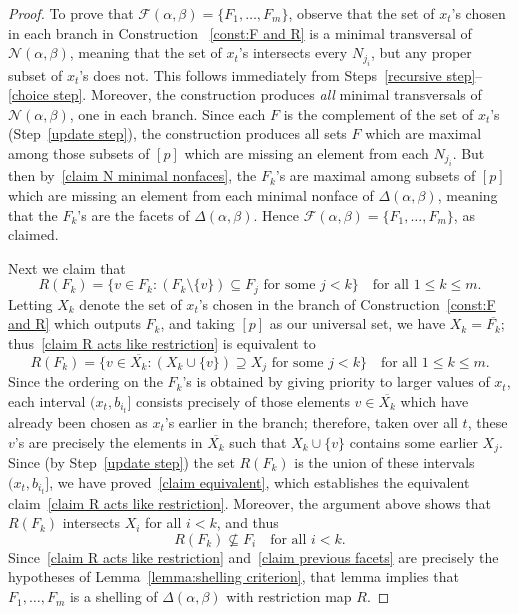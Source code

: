 \documentclass[noamsfonts,10pt]{amsart}
\newcommand{\NN}{\mathcal{N}}
\newcommand{\al}{\alpha}
\newcommand{\be}{\beta}
\newcommand{\F}{\mathcal{F}}
\newcommand{\1}{\mathbf{1}}
\theoremstyle{plain}
\theoremstyle{definition}
\numberwithin{equation}{section}
\begin{document}
\begin{proof}
    To prove that $\F(\al,\be) = \{F_1, \ldots, F_m\}$, observe that the set of $x_t$'s chosen in each branch in Construction ~\ref{const:F and R} is a minimal transversal of $\NN(\al,\be)$, meaning that the set of $x_t$'s intersects every $N_{j_i}$, but any proper subset of $x_t$'s does not.
    This follows immediately from Steps~\ref{recursive step}--\ref{choice step}.
    Moreover, the construction produces \emph{all} minimal transversals of $\NN(\al,\be)$, one in each branch.
    Since each $F$ is the complement of the set of $x_t$'s (Step~\ref{update step}), the construction produces all sets $F$ which are maximal among those subsets of $[p]$ which are missing an element from each $N_{j_i}$.
    But then by~\eqref{claim N minimal nonfaces}, the $F_k$'s are maximal among subsets of $[p]$ which are missing an element from each minimal nonface of $\Delta(\al,\be)$, meaning that the $F_k$'s are the facets of $\Delta(\al,\be)$.
    Hence $\F(\al,\be) = \{F_1, \ldots, F_m\}$, as claimed.

    Next we claim that 
    \begin{equation}
        \label{claim R acts like restriction}
        R(F_k) = \Big\{ v \in F_k : (F_k \setminus \{v\}) \subseteq F_j \text{ for some } j < k \Big\} \quad \text{for all $1 \leq k \leq m$}.
    \end{equation}
    Letting $X_k$ denote the set of $x_t$'s chosen in the branch of Construction~\ref{const:F and R} which outputs $F_k$, and taking $[p]$ as our universal set, we have $X_k = \overline{F_k}$;
    thus~\eqref{claim R acts like restriction} is equivalent to
    \begin{equation}
        \label{claim equivalent}
        R(F_k) = \Big\{ v \in \overline{X_k} : (X_k \cup \{v\} ) \supseteq X_j \text{ for some } j < k \Big\} \quad \text{for all } 1 \leq k \leq m.
    \end{equation}
    Since the ordering on the $F_k$'s is obtained by giving priority to larger values of $x_t$, each interval $(x_t, b_{i_t}]$  consists precisely of those elements $v \in \overline{X_k}$ which have already been chosen as $x_t$'s earlier in the branch;
    therefore, taken over all $t$, these $v$'s are precisely the elements in $\overline{X_k}$ such that $X_k \cup \{v\}$ contains some earlier $X_j$.
    Since (by Step~\ref{update step}) the set $R(F_k)$ is the union of these intervals $(x_t, b_{i_t}]$, we have proved~\eqref{claim equivalent}, which establishes the equivalent claim~\eqref{claim R acts like restriction}.
    Moreover, the argument above shows that $R(F_k)$ intersects $X_i$ for all $i < k$, and thus
    \begin{equation}
        \label{claim previous facets}
        R(F_k) \not\subseteq F_i \quad \text{for all } i < k.
    \end{equation}
    Since~\eqref{claim R acts like restriction} and~\eqref{claim previous facets} are precisely the hypotheses of Lemma~\ref{lemma:shelling criterion}, that lemma implies that $F_1, \ldots, F_m$ is a shelling of $\Delta(\al,\be)$ with restriction map $R$.
    \end{proof}
\end{document}
